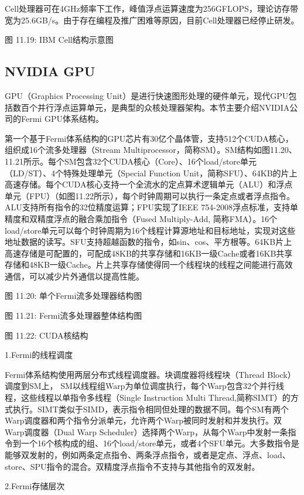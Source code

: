 \documentclass[]{ctexbook}
\begin{document}
Cell处理器可在4GHz频率下工作，峰值浮点运算速度为256GFLOPS，理论访存带宽为25.6GB/s。由于存在编程及推广困难等原因，目前Cell处理器已经停止研发。

图 11.19: IBM Cell结构示意图

\hypertarget{nvidia-gpu}{%
\subsection{NVIDIA GPU}\label{nvidia-gpu}}

GPU（Graphics Processing Unit）是进行快速图形处理的硬件单元，现代GPU包括数百个并行浮点运算单元，是典型的众核处理器架构。本节主要介绍NVIDIA公司的Fermi GPU体系结构。

第一个基于Fermi体系结构的GPU芯片有30亿个晶体管，支持512个CUDA核心，组织成16个流多处理器（Stream Multiprocessor，简称SM）。SM结构如图11.20、11.21所示。每个SM包含32个CUDA核心（Core）、16个load/store单元（LD/ST）、4个特殊处理单元（Special Function Unit，简称SFU）、64KB的片上高速存储。每个CUDA核心支持一个全流水的定点算术逻辑单元（ALU）和浮点单元（FPU）（如图11.22所示），每个时钟周期可以执行一条定点或者浮点指令。ALU支持所有指令的32位精度运算；FPU实现了IEEE 754-2008浮点标准，支持单精度和双精度浮点的融合乘加指令（Fused Multiply-Add, 简称FMA）。16个load/store单元可以每个时钟周期为16个线程计算源地址和目标地址，实现对这些地址数据的读写。SFU支持超越函数的指令，如sin、cos、平方根等。64KB片上高速存储是可配置的，可配成48KB的共享存储和16KB一级Cache或者16KB共享存储和48KB一级Cache。片上共享存储使得同一个线程块的线程之间能进行高效通信，可以减少片外通信以提高性能。

图 11.20: 单个Fermi流多处理器结构图

图 11.21: Fermi流多处理器整体结构图

图 11.22: CUDA核结构

1.Fermi的线程调度

Fermi体系结构使用两层分布式线程调度器。块调度器将线程块（Thread Block）调度到SM上， SM以线程组Warp为单位调度执行，每个Warp包含32个并行线程，这些线程以单指令多线程（Single Instruction Multi Thread,简称SIMT）的方式执行。SIMT类似于SIMD，表示指令相同但处理的数据不同。每个SM有两个Warp调度器和两个指令分派单元，允许两个Warp被同时发射和并发执行。双Warp调度器（Dual Warp Scheduler）选择两个Warp，从每个Warp中发射一条指令到一个16个核构成的组、16个load/store单元，或者4个SFU单元。大多数指令是能够双发射的，例如两条定点指令、两条浮点指令，或者是定点、浮点、load、store、SPU指令的混合。双精度浮点指令不支持与其他指令的双发射。

2.Fermi存储层次
\end{document}
